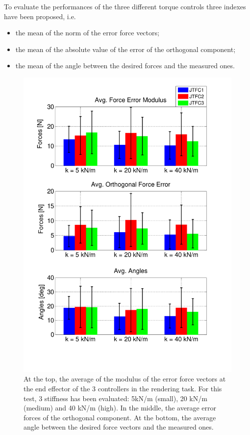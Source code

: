 \documentclass[journal]{IEEEtran}
\begin{document}
\par To evaluate the performances of the three different torque controls three indexes have been proposed, i.e. 
\begin{itemize}
	\item the mean of the norm of the error force vectors;
	\item the mean of the absolute value of the error of the orthogonal component;
	\item the mean of the angle between the desired forces and the measured ones.
\end{itemize}

\begin{figure}[htb]
	\centering
	\includegraphics[width=1\columnwidth]{erroriForzeAngoliRendering}
	\caption{At the top, the average of the modulus of the error force vectors at the end effector of the 3 controllers in the rendering task. For this test, 3 stiffness has been evaluated: 5kN/m (small), 20 kN/m (medium) and 40 kN/m (high). In the middle, the average error forces of the orthogonal component. At the bottom, the average angle between the desired force vectors and the measured ones.}
	\label{fig:renderingErrors}
\end{figure}
\end{document}
